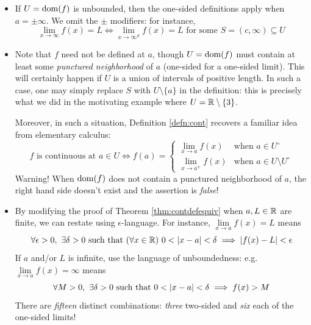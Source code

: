 \begin{itemize}
  \item If $U=\operatorname{dom}(f)$ is unbounded, then the one-sided definitions apply when $a=\pm\infty$. We omit the $\pm$ modifiers: for instance,
  \[
  	\lim_{x\to\infty}f(x)=L\iff 
  	\lim\limits_{x\to\infty^S}f(x)=L\text{ for some }
  	S=(c,\infty)\subseteq U
  \]
	\item\label{it:contlimit} Note that $f$ need not be defined at $a$, though $U=\operatorname{dom}(f)$ must contain at least some \emph{punctured neighborhood} of $a$ (one-sided for a one-sided limit). This will certainly happen if $U$ is a union of intervals of positive length. In such a case, one may simply replace $S$ with $U\setminus\{a\}$ in the definition: this is precisely what we did in the motivating example where $U=\mathbb{R}\setminus\{3\}$.\par
  Moreover, in such a situation, Definition \ref{defn:cont} recovers a familiar idea from elementary calculus:
  \[
  	f \text{ is continuous at } a\in U
  	\iff f(a)=
  	\begin{cases}
  		\lim\limits_{x\to a} f(x)&\text{when }a\in U^\circ\\
  		\lim\limits_{x\to a^\pm} f(x)&\text{when }a\in U\setminus U^\circ
  	\end{cases}
  	\tag{$\ast$}
 	\]
 	Warning! When $\operatorname{dom}(f)$ does not contain a punctured neighborhood of $a$, the right hand side doesn't exist and the assertion is \emph{false}!
  \item By modifying the proof of Theorem \ref{thm:contdefequiv} when $a,L\in\mathbb{R}$ are finite, we can restate using $\epsilon$-language. For instance, $\lim\limits_{x\to a}f(x)=L$ means
  \[
  	\forall\epsilon>0,\ \exists \delta>0\text{ such that }(\forall x\in\R)\ 0<\nm{x-a}<\delta\implies \nm{f(x)-L}<\epsilon
  \]
  If $a$ and/or $L$ is infinite, use the language of unboundedness: e.g. $\lim\limits_{x\to a}f(x)=\infty$ means
  \[
  	\forall M>0,\ \exists \delta>0\text{ such that }0<\left| x-a\right|<\delta\implies f(x)>M
  \]
  There are \emph{fifteen} distinct combinations: \emph{three} two-sided and \emph{six} each of the one-sided limits!
\end{itemize}
\goodbreak


